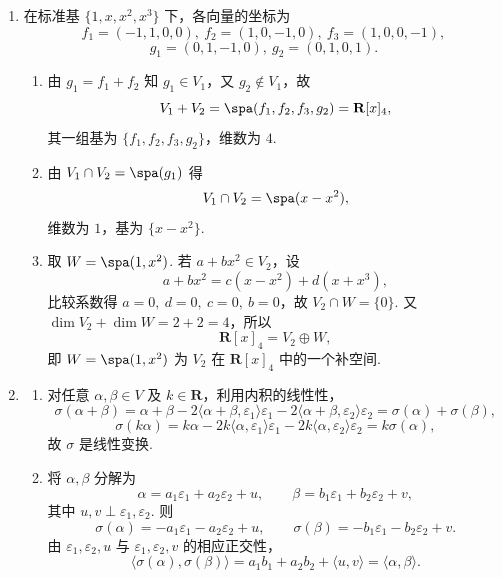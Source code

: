 \begin{enumerate}
    \item 在标准基 $\{1,x,x^2,x^3\}$ 下，各向量的坐标为
    \[
        f_1=(-1,1,0,0),\ f_2=(1,0,-1,0),\ f_3=(1,0,0,-1),
    \]
    \[
        g_1=(0,1,-1,0),\ g_2=(0,1,0,1).
    \]
    \begin{enumerate}
        \item 由 $g_1=f_1+f_2$ 知 $g_1\in V_1$，又 $g_2\notin V_1$，故
        \[
            V_1+V_2=\spa(f_1,f_2,f_3,g_2)=\mathbf{R}[x]_4,
        \]
        其一组基为 $\{f_1,f_2,f_3,g_2\}$，维数为 $4$.

        \item 由 $V_1\cap V_2=\spa(g_1)$ 得
        \[
            V_1\cap V_2=\spa(x-x^2),
        \]
        维数为 $1$，基为 $\{x-x^2\}$.

        \item 取 $W=\spa(1,x^2)$. 若 $a+bx^2\in V_2$，设
        \[
            a+bx^2=c(x-x^2)+d(x+x^3),
        \]
        比较系数得 $a=0,\ d=0,\ c=0,\ b=0$，故 $V_2\cap W=\{0\}$. 又 $\dim V_2+\dim W=2+2=4$，所以
        \[
            \mathbf{R}[x]_4=V_2\oplus W,
        \]
        即 $W=\spa(1,x^2)$ 为 $V_2$ 在 $\mathbf{R}[x]_4$ 中的一个补空间.
    \end{enumerate}

    \item
    \begin{enumerate}
        \item 对任意 $\alpha,\beta\in V$ 及 $k\in\mathbf{R}$，利用内积的线性性，
        \[
            \sigma(\alpha+\beta)
            =\alpha+\beta-2\langle\alpha+\beta,\varepsilon_1\rangle\varepsilon_1
            -2\langle\alpha+\beta,\varepsilon_2\rangle\varepsilon_2
            =\sigma(\alpha)+\sigma(\beta),
        \]
        \[
            \sigma(k\alpha)
            =k\alpha-2k\langle\alpha,\varepsilon_1\rangle\varepsilon_1
            -2k\langle\alpha,\varepsilon_2\rangle\varepsilon_2
            =k\sigma(\alpha),
        \]
        故 $\sigma$ 是线性变换.

        \item 将 $\alpha,\beta$ 分解为
        \[
            \alpha=a_1\varepsilon_1+a_2\varepsilon_2+u,\qquad
            \beta=b_1\varepsilon_1+b_2\varepsilon_2+v,
        \]
        其中 $u,v\perp\varepsilon_1,\varepsilon_2$. 则
        \[
            \sigma(\alpha)=-a_1\varepsilon_1-a_2\varepsilon_2+u,\qquad
            \sigma(\beta)=-b_1\varepsilon_1-b_2\varepsilon_2+v.
        \]
        由 $\varepsilon_1,\varepsilon_2,u$ 与 $\varepsilon_1,\varepsilon_2,v$ 的相应正交性，
        \[
            \langle\sigma(\alpha),\sigma(\beta)\rangle
            =a_1b_1+a_2b_2+\langle u,v\rangle
            =\langle\alpha,\beta\rangle.
        \]
    \end{enumerate}


\end{enumerate}
